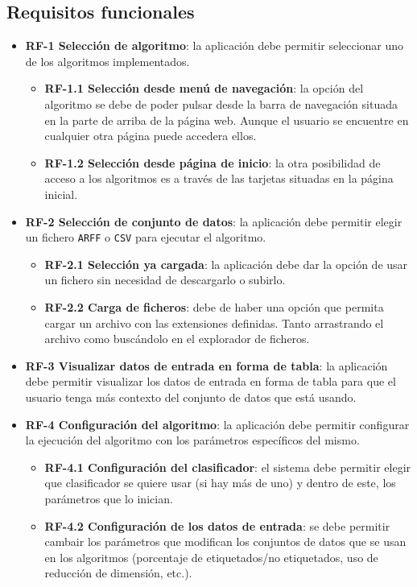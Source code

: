 \subsection{Requisitos funcionales}

\begin{itemize}
	\item \textbf{RF-1 Selección de algoritmo}: la aplicación debe
	permitir seleccionar uno de los algoritmos implementados.
	\begin{itemize}
		\item \textbf{RF-1.1 Selección desde menú de navegación}: la opción del algoritmo se debe de poder pulsar desde la barra de navegación situada en la parte de arriba de la página web. Aunque el usuario se encuentre en cualquier otra página puede accedera ellos.
		\item \textbf{RF-1.2 Selección desde página de inicio}: la otra posibilidad de acceso a los algoritmos es a través de las tarjetas situadas en la página inicial.
	\end{itemize}
	\item \textbf{RF-2 Selección de conjunto de datos}: la aplicación debe
	permitir elegir un fichero \texttt{ARFF} o \texttt{CSV} para ejecutar el algoritmo.
	\begin{itemize}
		\item \textbf{RF-2.1 Selección ya cargada}: la aplicación debe dar la opción de usar un fichero sin necesidad de descargarlo o subirlo.
		\item \textbf{RF-2.2 Carga de ficheros}: debe de haber una opción que permita cargar un archivo con las extensiones definidas. Tanto arrastrando el archivo como buscándolo en el explorador de ficheros.
	\end{itemize} 
	\item \textbf{RF-3 Visualizar datos de entrada en forma de tabla}: la aplicación debe permitir visualizar los datos de entrada en forma de tabla para que el usuario tenga más contexto del conjunto de datos que está usando.
	\item \textbf{RF-4 Configuración del algoritmo}: la aplicación debe	permitir configurar la ejecución del algoritmo con los parámetros específicos del mismo.
	\begin{itemize}
		\item \textbf{RF-4.1 Configuración del clasificador}: el sistema debe permitir elegir que clasificador se quiere usar (si hay más de uno) y dentro de este, los parámetros que lo inician.
		\item \textbf{RF-4.2 Configuración de los datos de entrada}: se debe permitir cambair los parámetros que modifican los conjuntos de datos que se usan en los algoritmos (porcentaje de etiquetados/no etiquetados, uso de reducción de dimensión, etc.).

\end{itemize}
\end{itemize}
